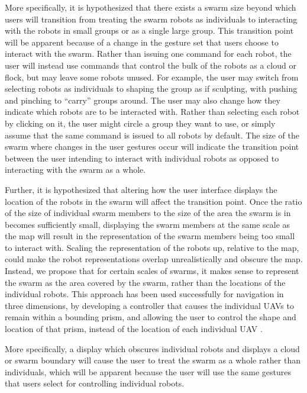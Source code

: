 More specifically, it is hypothesized that there exists a swarm size beyond which users will transition from treating the swarm robots as individuals to interacting with the robots in small groups or as a single large group. 
This transition point will be apparent because of a change in the gesture set that users choose to interact with the swarm. 
Rather than issuing one command for each robot, the user will instead use commands that control the bulk of the robots as a cloud or flock, but may leave some robots unused. 
For example, the user may switch from selecting robots as individuals to shaping the group as if sculpting, with pushing and pinching to ``carry'' groups around. 
The user may also change how they indicate which robots are to be interacted with. 
Rather than selecting each robot by clicking on it, the user might circle a group they want to use, or simply assume that the same command is issued to all robots by default. 
The size of the swarm where changes in the user gestures occur will indicate the transition point between the user intending to interact with individual robots as opposed to interacting with the swarm as a whole. 

Further, it is hypothesized that altering how the user interface displays the location of the robots in the swarm will affect the transition point.
Once the ratio of the size of individual swarm members to the size of the area the swarm is in becomes sufficiently small, displaying the swarm members at the same scale as the map will result in the representation of the swarm members being too small to interact with. 
Scaling the representation of the robots up, relative to the map, could make the robot representations overlap unrealistically and obscure the map. 
Instead, we propose that for certain scales of swarms, it makes sense to represent the swarm as the area covered by the swarm, rather than the locations of the individual robots.
This approach has been used successfully for navigation in three dimensions, by developing a controller that causes the individual UAVs to remain within a bounding prism, and allowing the user to control the shape and location of that prism, instead of the location of each individual UAV \citep{ayanian2014controlling}.
 
More specifically, a display which obscures individual robots and displays a cloud or swarm boundary will cause the user to treat the swarm as a whole rather than individuals, which will be apparent because the user will use the same gestures that users select for controlling individual robots. 


